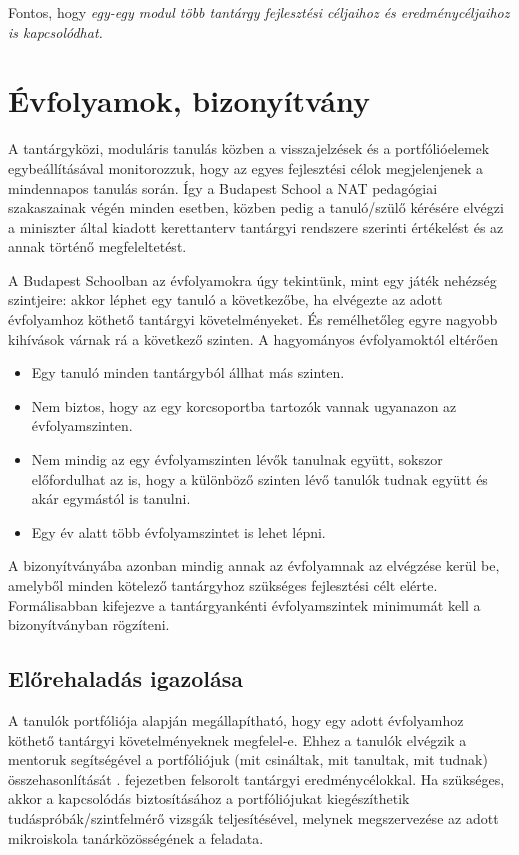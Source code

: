 Fontos, hogy \emph{egy-egy modul több tantárgy fejlesztési céljaihoz és eredménycéljaihoz is kapcsolódhat.}

\section{Évfolyamok, bizonyítvány}
\label{sec:evfolyamok}

A tantárgyközi, moduláris tanulás közben a visszajelzések és a portfólióelemek egybeállításával monitorozzuk, hogy az egyes fejlesztési célok megjelenjenek a mindennapos tanulás során. Így a Budapest School a NAT pedagógiai szakaszainak végén minden esetben, közben pedig a tanuló/szülő kérésére elvégzi a miniszter által kiadott kerettanterv tantárgyi rendszere szerinti értékelést és az annak történő megfeleltetést.

A Budapest Schoolban az évfolyamokra úgy tekintünk, mint egy játék nehézség szintjeire: akkor léphet egy tanuló a következőbe, ha elvégezte az adott évfolyamhoz köthető tantárgyi követelményeket. És remélhetőleg egyre nagyobb kihívások várnak rá a következő szinten. A hagyományos évfolyamoktól eltérően

\begin{itemize}
\item Egy tanuló minden tantárgyból állhat más szinten.
\item Nem biztos, hogy az egy korcsoportba tartozók vannak ugyanazon az évfolyamszinten.
\item Nem mindig az egy évfolyamszinten lévők tanulnak együtt, sokszor előfordulhat az is, hogy a különböző szinten lévő tanulók tudnak együtt és akár egymástól is tanulni.
\item Egy év alatt több évfolyamszintet is lehet lépni.
\end{itemize}

 A bizonyítványába azonban mindig annak az évfolyamnak az elvégzése kerül be, amelyből minden kötelező tantárgyhoz szükséges fejlesztési célt elérte. Formálisabban kifejezve a tantárgyankénti évfolyamszintek minimumát kell a bizonyítványban rögzíteni.

\subsection{Előrehaladás igazolása}
A tanulók portfóliója alapján megállapítható, hogy egy adott évfolyamhoz köthető tantárgyi követelményeknek megfelel-e. Ehhez a tanulók elvégzik a mentoruk segítségével a portfóliójuk (mit csináltak, mit tanultak, mit tudnak) összehasonlítását  . fejezetben felsorolt tantárgyi eredménycélokkal. Ha szükséges, akkor a kapcsolódás biztosításához a portfóliójukat kiegészíthetik tudáspróbák/szintfelmérő vizsgák teljesítésével, melynek megszervezése az adott mikroiskola tanárközösségének a feladata.

